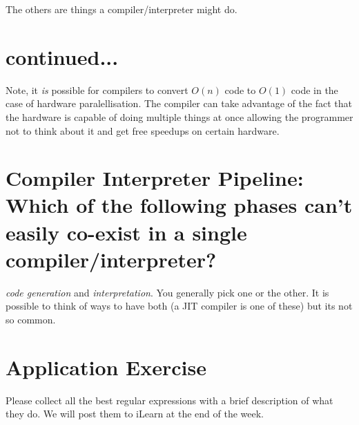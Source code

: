\documentclass[
paper=160mm:90mm, %
paper=landscape,
fontsize=11pt, %
pagesize, %
parskip=half-, %
]{scrartcl} %
\begin{document}
The others are things a compiler/interpreter might do.

\section{continued...}
Note, it \emph{is} possible for compilers to convert $O(n)$ code to $O(1)$ code in the case of hardware paralellisation.  The compiler can take advantage of the fact that the hardware is capable of doing multiple things at once allowing the programmer not to think about it and get free speedups on certain hardware.
    
\section{Compiler Interpreter Pipeline: Which of the following phases can't easily co-exist in a single compiler/interpreter?}
\emph{code generation} and \emph{interpretation}.  You generally pick one or the other.  It is possible to think of ways to have both (a JIT compiler is one of these) but its not so common.

\section{Application Exercise}
Please collect all the best regular expressions with a brief description of what they do.  We will post them to iLearn at the end of the week.
\end{document}
